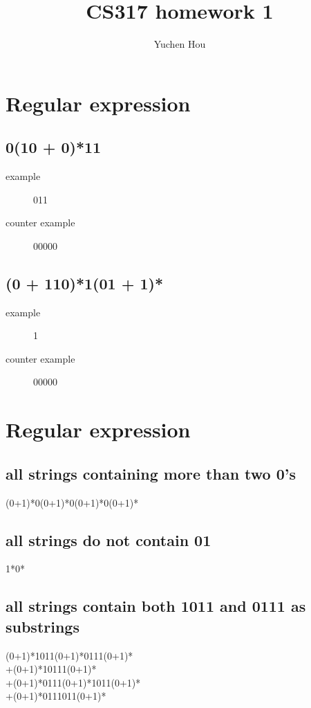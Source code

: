 \documentclass{article}
\begin{document}
\title{CS317 homework 1}
\author{Yuchen Hou}
\maketitle

\section{Regular expression}

\subsection{0(10 + 0)*11}
\begin{description}
\item[example] 011
\item[counter example] 00000
\end{description}

\subsection{(0 + 110)*1(01 + 1)*}
\begin{description}
\item[example] 1
\item[counter example] 00000
\end{description}

\section{Regular expression}

\subsection{all strings containing more than two 0’s}
(0+1)*0(0+1)*0(0+1)*0(0+1)*

\subsection{all strings do not contain 01}
1*0*

\subsection{all strings contain both 1011 and 0111 as substrings}
(0+1)*1011(0+1)*0111(0+1)*\\
+(0+1)*10111(0+1)*\\
+(0+1)*0111(0+1)*1011(0+1)*\\
+(0+1)*0111011(0+1)*
\end{document}
